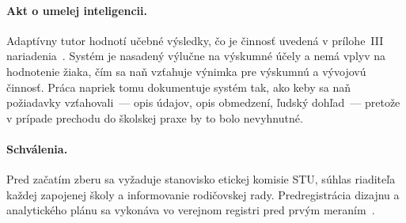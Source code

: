 \paragraph{Akt o umelej inteligencii.} Adaptívny tutor hodnotí učebné výsledky, čo je činnosť uvedená v prílohe~III nariadenia~\cite{euaiact2024}. Systém je nasadený výlučne na výskumné účely a nemá vplyv na hodnotenie žiaka, čím sa naň vzťahuje výnimka pre výskumnú a vývojovú činnosť. Práca napriek tomu dokumentuje systém tak, ako keby sa naň požiadavky vzťahovali~--- opis údajov, opis obmedzení, ľudský dohľad~--- pretože v prípade prechodu do školskej praxe by to bolo nevyhnutné.

\paragraph{Schválenia.} Pred začatím zberu sa vyžaduje stanovisko etickej komisie STU, súhlas riaditeľa každej zapojenej školy a informovanie rodičovskej rady. Predregistrácia dizajnu a analytického plánu sa vykonáva vo verejnom registri pred prvým meraním~\cite{nosek2018preregistration}.
